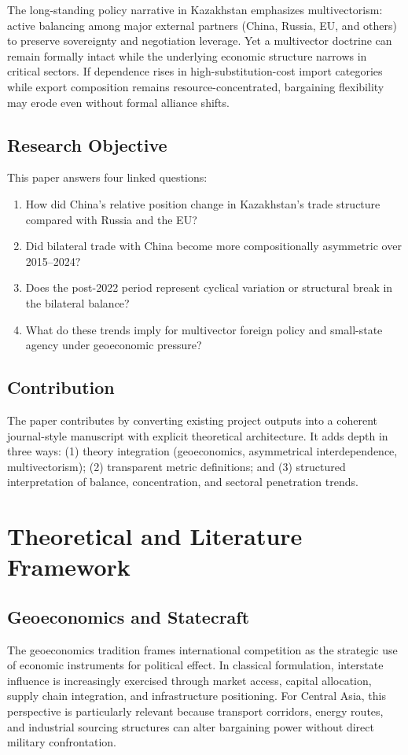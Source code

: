 \documentclass[12pt]{article}
\begin{document}
The long-standing policy narrative in Kazakhstan emphasizes multivectorism: active balancing among major external partners (China, Russia, EU, and others) to preserve sovereignty and negotiation leverage. Yet a multivector doctrine can remain formally intact while the underlying economic structure narrows in critical sectors. If dependence rises in high-substitution-cost import categories while export composition remains resource-concentrated, bargaining flexibility may erode even without formal alliance shifts.

\subsection{Research Objective}
This paper answers four linked questions:
\begin{enumerate}[leftmargin=*]
\item How did China's relative position change in Kazakhstan's trade structure compared with Russia and the EU?
\item Did bilateral trade with China become more compositionally asymmetric over 2015--2024?
\item Does the post-2022 period represent cyclical variation or structural break in the bilateral balance?
\item What do these trends imply for multivector foreign policy and small-state agency under geoeconomic pressure?
\end{enumerate}

\subsection{Contribution}
The paper contributes by converting existing project outputs into a coherent journal-style manuscript with explicit theoretical architecture. It adds depth in three ways: (1) theory integration (geoeconomics, asymmetrical interdependence, multivectorism); (2) transparent metric definitions; and (3) structured interpretation of balance, concentration, and sectoral penetration trends.

\section{Theoretical and Literature Framework}
\subsection{Geoeconomics and Statecraft}
The geoeconomics tradition frames international competition as the strategic use of economic instruments for political effect. In classical formulation, interstate influence is increasingly exercised through market access, capital allocation, supply chain integration, and infrastructure positioning. For Central Asia, this perspective is particularly relevant because transport corridors, energy routes, and industrial sourcing structures can alter bargaining power without direct military confrontation.
\end{document}
